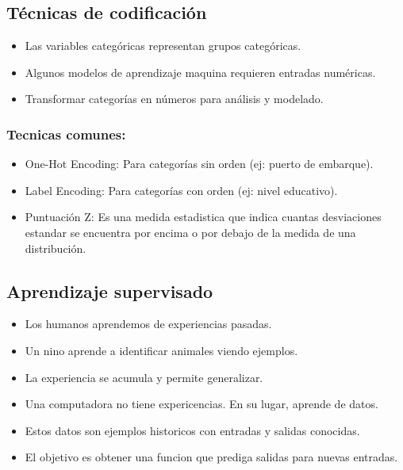 \documentclass[11pt]{article}
\begin{document}
\subsection{Técnicas de codificación}
\label{sec:orgf88b41d}
\begin{itemize}
\item Las variables categóricas representan grupos categóricas.
\item Algunos modelos de aprendizaje maquina requieren entradas numéricas.
\item Transformar categorías en números para análisis y modelado.
\end{itemize}
\subsubsection{Tecnicas comunes:}
\label{sec:org28b193d}
\begin{itemize}
\item One-Hot Encoding: Para categorías sin orden (ej: puerto de embarque).
\item Label Encoding: Para categorías con orden (ej: nivel educativo).
\item Puntuación Z: Es una medida estadistica que indica cuantas desviaciones estandar se encuentra por encima o por debajo de la medida de una distribución.
\end{itemize}
\subsection{Aprendizaje supervisado}
\label{sec:orgd554a07}
\begin{itemize}
\item Los humanos aprendemos de experiencias pasadas.
\item Un nino aprende a identificar animales viendo ejemplos.
\item La experiencia se acumula y permite generalizar.
\item Una computadora no tiene expericencias. En su lugar, aprende de datos.
\item Estos datos son ejemplos historicos con entradas y salidas conocidas.
\item El objetivo es obtener una funcion que prediga salidas para nuevas entradas.
\end{itemize}
\end{document}
